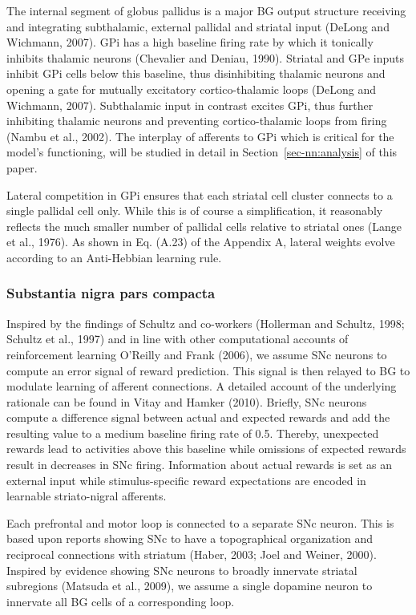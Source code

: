 \documentclass[
  11pt,
  a4paper,
]{scrbook}
\begin{document}
The internal segment of globus pallidus is a major BG output structure
receiving and integrating subthalamic, external pallidal and striatal
input (DeLong and Wichmann, 2007). GPi has a high baseline firing rate
by which it tonically inhibits thalamic neurons (Chevalier and Deniau,
1990). Striatal and GPe inputs inhibit GPi cells below this baseline,
thus disinhibiting thalamic neurons and opening a gate for mutually
excitatory cortico-thalamic loops (DeLong and Wichmann, 2007).
Subthalamic input in contrast excites GPi, thus further inhibiting
thalamic neurons and preventing cortico-thalamic loops from firing
(Nambu et al., 2002). The interplay of afferents to GPi which is
critical for the model's functioning, will be studied in detail in
Section~\ref{sec-nn:analysis} of this paper.

Lateral competition in GPi ensures that each striatal cell cluster
connects to a single pallidal cell only. While this is of course a
simplification, it reasonably reflects the much smaller number of
pallidal cells relative to striatal ones (Lange et al., 1976). As shown
in Eq. (A.23) of the Appendix A, lateral weights evolve according to an
Anti-Hebbian learning rule.

\subsubsection*{Substantia nigra pars
compacta}\label{substantia-nigra-pars-compacta-1}

Inspired by the findings of Schultz and co-workers (Hollerman and
Schultz, 1998; Schultz et al., 1997) and in line with other
computational accounts of reinforcement learning O'Reilly and Frank
(2006), we assume SNc neurons to compute an error signal of reward
prediction. This signal is then relayed to BG to modulate learning of
afferent connections. A detailed account of the underlying rationale can
be found in Vitay and Hamker (2010). Briefly, SNc neurons compute a
difference signal between actual and expected rewards and add the
resulting value to a medium baseline firing rate of 0.5. Thereby,
unexpected rewards lead to activities above this baseline while
omissions of expected rewards result in decreases in SNc firing.
Information about actual rewards is set as an external input while
stimulus-specific reward expectations are encoded in learnable
striato-nigral afferents.

Each prefrontal and motor loop is connected to a separate SNc neuron.
This is based upon reports showing SNc to have a topographical
organization and reciprocal connections with striatum (Haber, 2003; Joel
and Weiner, 2000). Inspired by evidence showing SNc neurons to broadly
innervate striatal subregions (Matsuda et al., 2009), we assume a single
dopamine neuron to innervate all BG cells of a corresponding loop.
\end{document}
